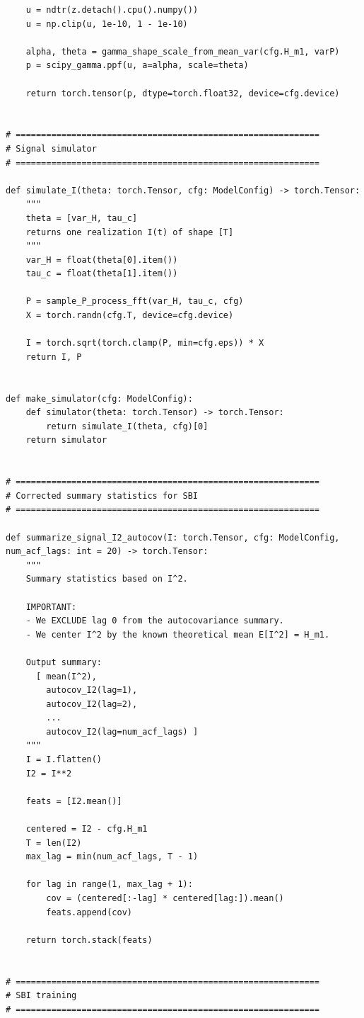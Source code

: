 \documentclass{article}
\begin{document}
\begin{verbatim}
    u = ndtr(z.detach().cpu().numpy())
    u = np.clip(u, 1e-10, 1 - 1e-10)

    alpha, theta = gamma_shape_scale_from_mean_var(cfg.H_m1, varP)
    p = scipy_gamma.ppf(u, a=alpha, scale=theta)

    return torch.tensor(p, dtype=torch.float32, device=cfg.device)


# ============================================================
# Signal simulator
# ============================================================

def simulate_I(theta: torch.Tensor, cfg: ModelConfig) -> torch.Tensor:
    """
    theta = [var_H, tau_c]
    returns one realization I(t) of shape [T]
    """
    var_H = float(theta[0].item())
    tau_c = float(theta[1].item())

    P = sample_P_process_fft(var_H, tau_c, cfg)
    X = torch.randn(cfg.T, device=cfg.device)

    I = torch.sqrt(torch.clamp(P, min=cfg.eps)) * X
    return I, P


def make_simulator(cfg: ModelConfig):
    def simulator(theta: torch.Tensor) -> torch.Tensor:
        return simulate_I(theta, cfg)[0]
    return simulator


# ============================================================
# Corrected summary statistics for SBI
# ============================================================

def summarize_signal_I2_autocov(I: torch.Tensor, cfg: ModelConfig, num_acf_lags: int = 20) -> torch.Tensor:
    """
    Summary statistics based on I^2.

    IMPORTANT:
    - We EXCLUDE lag 0 from the autocovariance summary.
    - We center I^2 by the known theoretical mean E[I^2] = H_m1.

    Output summary:
      [ mean(I^2),
        autocov_I2(lag=1),
        autocov_I2(lag=2),
        ...
        autocov_I2(lag=num_acf_lags) ]
    """
    I = I.flatten()
    I2 = I**2

    feats = [I2.mean()]

    centered = I2 - cfg.H_m1
    T = len(I2)
    max_lag = min(num_acf_lags, T - 1)

    for lag in range(1, max_lag + 1):
        cov = (centered[:-lag] * centered[lag:]).mean()
        feats.append(cov)

    return torch.stack(feats)


# ============================================================
# SBI training
# ============================================================


\end{verbatim}
\end{document}
